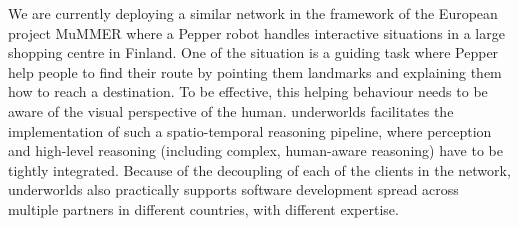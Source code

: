 \documentclass[letterpaper, 10pt, conference]{ieeeconf}
\newcommand{\uwds}{{\sc underworlds}\xspace}
\begin{document}

We are currently deploying a similar network in the framework of the European
project MuMMER where a Pepper robot handles interactive situations in a large
shopping centre in Finland. One of the situation is a guiding task where Pepper
help people to find their route by pointing them landmarks and explaining them
how to reach a destination. To be effective, this helping behaviour needs to be
aware of the visual perspective of the human. \uwds facilitates the
implementation of such a spatio-temporal reasoning pipeline, where perception
and high-level reasoning (including complex, human-aware reasoning) have to be
tightly integrated. Because of the decoupling of each of the clients in the
network, \uwds also practically supports software development spread across
multiple partners in different countries, with different expertise.

\end{document}
